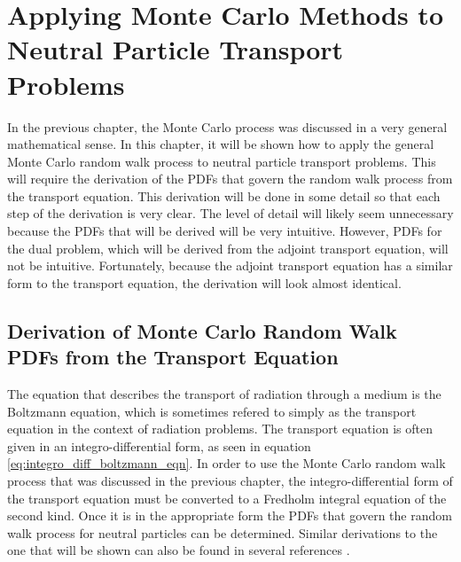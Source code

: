 \chapter{Applying Monte Carlo Methods to Neutral Particle Transport 
  Problems}
\label{ch:neutral_particle_transport}
In the previous chapter, the Monte Carlo process was discussed in a very
general mathematical sense. In this chapter, it will be shown how to apply
the general Monte Carlo random walk process to neutral particle transport 
problems. This will require the derivation of the PDFs that govern the random 
walk process from the transport equation. This derivation will be done in
some detail so that each step of the derivation is very clear. The level of
detail will likely seem unnecessary because the PDFs that will be derived
will be very intuitive. However, PDFs for the dual problem, which will be
derived from the adjoint transport equation, will not be intuitive. 
Fortunately, because the adjoint transport equation has a similar form to the
transport equation, the derivation will look almost identical. 

\section{Derivation of Monte Carlo Random Walk PDFs from the Transport Equation}
\label{sec:der_prob_laws_for_proc}
The equation that describes the transport of radiation through a medium is
the Boltzmann equation, which is sometimes refered to simply as the transport
equation in the context of radiation problems. The transport equation is often
given in an integro-differential form, as seen in equation 
\ref{eq:integro_diff_boltzmann_eqn}. In order to use the Monte Carlo random
walk process that was discussed in the previous chapter, the 
integro-differential form of the transport equation must be converted to a 
Fredholm integral equation of the second kind. Once it is in the appropriate
form the PDFs that govern the random walk process for neutral particles can be 
determined. Similar derivations to the one that will be shown can also
be found in several references \citep{lewis, hoogenboom, irving}.
 

